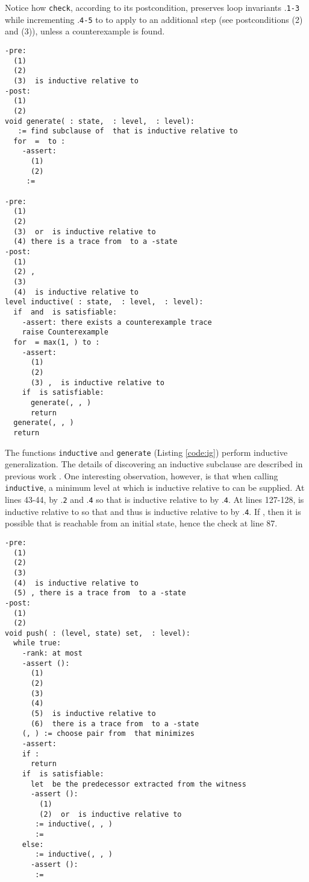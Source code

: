 \documentclass{llncs}
\begin{document}
Notice how {\tt check}, according to its postcondition, preserves loop
invariants .{\tt 1-3} while incrementing .{\tt 4-5} to to apply
to an additional step (see postconditions (2) and (3)), unless a
counterexample is found.

\begin{lstlisting}[name=code,caption={-step relative inductive generalization},label=code:ig,float=tb]
-pre:  
  (1) 
  (2) 
  (3)  is inductive relative to 
-post: 
  (1) 
  (2) 
void generate( : state,  : level,  : level):
   := find subclause of  that is inductive relative to 
  for  =  to :
    -assert: 
      (1) 
      (2) 
     := 

-pre:  
  (1) 
  (2) 
  (3)  or  is inductive relative to 
  (4) there is a trace from  to a -state
-post: 
  (1) 
  (2) , 
  (3) 
  (4)  is inductive relative to 
level inductive( : state,  : level,  : level):
  if  and  is satisfiable:
    -assert: there exists a counterexample trace
    raise Counterexample
  for  = max(1, ) to :
    -assert: 
      (1) 
      (2) 
      (3) ,  is inductive relative to 
    if  is satisfiable:
      generate(, , )
      return 
  generate(, , )
  return 
\end{lstlisting}

The functions {\tt inductive} and {\tt generate} (Listing
\ref{code:ig}) perform inductive generalization.  The details of
discovering an inductive subclause are described in previous work
\cite{Bradley+Manna/2007}.  One interesting observation, however, is
that when calling {\tt inductive}, a minimum level  at which
 is inductive relative to  can be supplied.  At
lines 43-44,  by .{\tt 2} and .{\tt 4}
so that  is inductive relative to  by .{\tt 4}.
At lines 127-128,  is inductive relative to  so that
 and thus  is inductive relative to
 by .{\tt 4}.  If , then it is possible that
 is reachable from an initial state, hence the check at line 87.

\begin{lstlisting}[name=code,caption={The {\tt push} function for -step relative inductive generalization},label=code:push,float=tb]
-pre:  
  (1) 
  (2) 
  (3) 
  (4)  is inductive relative to 
  (5) , there is a trace from  to a -state
-post:
  (1) 
  (2) 
void push( : (level, state) set,  : level):
  while true:
    -rank: at most 
    -assert ():
      (1) 
      (2) 
      (3) 
      (4) 
      (5)  is inductive relative to 
      (6)  there is a trace from  to a -state
    (, ) := choose pair from  that minimizes 
    -assert: 
    if :
      return
    if  is satisfiable:
      let  be the predecessor extracted from the witness
      -assert ():
        (1) 
        (2)  or  is inductive relative to 
       := inductive(, , )
       := 
    else:
       := inductive(, , )
      -assert (): 
       := 
\end{lstlisting}
\end{document}
